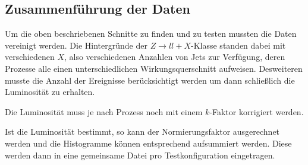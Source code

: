 \subsection{Zusammenführung der Daten}
\label{cha:normierung}
Um die oben beschriebenen Schnitte zu finden und zu testen mussten die Daten
vereinigt werden. Die Hintergründe der $Z\to ll + X$-Klasse standen dabei mit
verschiedenen $X$, also verschiedenen Anzahlen von Jets zur Verfügung, deren
Prozesse alle einen unterschiedlichen Wirkungsquerschnitt aufweisen. Desweiteren
musste die Anzahl der Ereignisse berücksichtigt werden um dann schließlich die
Luminosität zu erhalten.

\begin{table}
  \centering
  \caption{Wirkungsquerschnitte der Hintergründe}
  \label{tab:wqs}
\end{table}

Die Luminosität muss je nach Prozess noch mit einem $k$-Faktor korrigiert
werden.

Ist die Luminosität bestimmt, so kann der Normierungsfaktor ausgerechnet werden
und die Histogramme können entsprechend aufsummiert werden. Diese werden dann in
eine gemeinsame Datei pro Testkonfiguration eingetragen.
